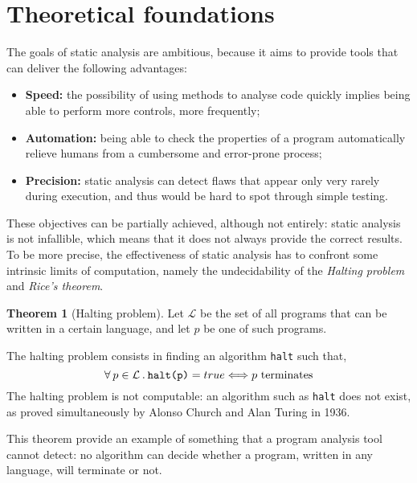 \documentclass[12pt,a4paper]{book}
\newcommand{\st}{\hspace{2px}.\hspace{2px}}
\theoremstyle{definition}
\begin{document}
	\section{Theoretical foundations}
	The goals of static analysis are ambitious, because it aims to provide tools that can deliver the following advantages:
	\begin{itemize}
		\item \textbf{Speed:} the possibility of using methods to analyse code quickly implies being able to perform more controls, more frequently; 
		\item \textbf{Automation:} being able to check the properties of a program automatically relieve humans from a cumbersome and error-prone process;
		\item \textbf{Precision:} static analysis can detect flaws that appear only very rarely during execution, and thus would be hard to spot through simple testing.
	\end{itemize}
	These objectives can be partially achieved, although not entirely:  static analysis is not infallible, which means that it does not always provide the correct results. To be more precise, the effectiveness of static analysis has to confront some intrinsic limits of computation, namely the undecidability of the \textit{Halting problem} and \textit{Rice's theorem}. 
	\theoremstyle{theorem}
	\newtheorem{thm}{Theorem}
	\begin{thm}[Halting problem] Let $\mathcal{L}$ be the set of all programs that can be written in a certain language, and let $p$ be one of such programs. 
		
		The halting problem consists in finding an algorithm \texttt{halt} such that,  
		\[
		\forall\hspace{2px}p\in\mathcal{L}\st\texttt{halt(p)} = true \Longleftrightarrow p\text{ terminates}
		\]
		The halting problem is not computable: an algorithm such as \texttt{halt} does not exist, as proved simultaneously by Alonso Church \cite{Church1936} and Alan Turing \cite{Turing1937} in 1936.
	\end{thm}
	This theorem provide an example of something that a program analysis tool cannot detect: no algorithm can decide whether a program, written in any language, will terminate or not.
	
\end{document}
